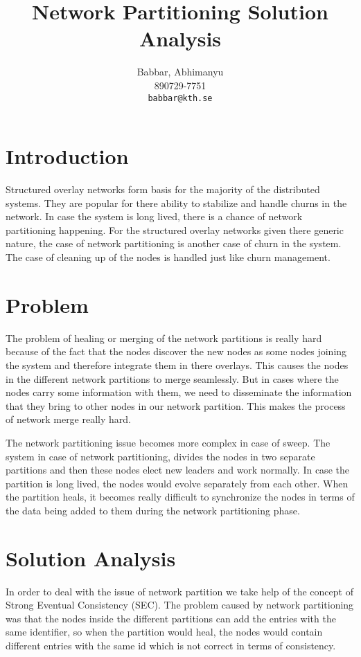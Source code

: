 \documentclass[a4paper, 11pt]{article}
\author{
  Babbar, Abhimanyu\\
  \textsc{890729-7751}\\
  \texttt{babbar@kth.se}
}
\title{Network Partitioning Solution Analysis}
\begin{document}
\maketitle 

\section{Introduction}

Structured overlay networks form basis for the majority of the distributed systems. They are popular for there ability to stabilize and handle churns in the network. In case the system is long lived, there is a chance of network partitioning happening. For the structured overlay networks given there generic nature, the case of network partitioning is another case of churn in the system. The case of cleaning up of the nodes is handled just like churn management. \\



\section{Problem}

The problem of healing or merging of the network partitions is really hard because of the fact that the nodes discover the new nodes as some nodes joining the system and therefore integrate them in there overlays. This causes the nodes in the different network partitions to merge seamlessly. But in cases where the nodes carry some information with them, we need to disseminate the information that they bring to other nodes in our network partition. This makes the process of network merge really hard.

The network partitioning issue becomes more complex in case of sweep. The system in case of network partitioning, divides the nodes in two separate partitions and then these nodes elect new leaders and work normally. In case the partition is long lived, the nodes would evolve separately from each other. 
When the partition heals, it becomes really difficult to synchronize the nodes in terms of the data being added to them during the network partitioning phase.

\section{Solution Analysis}

In order to deal with the issue of network partition we take help of the concept of Strong Eventual Consistency (SEC). The problem caused by network partitioning was that the nodes inside the different partitions can add the entries with the same identifier, so when the partition would heal, the nodes would contain different entries with the same id which is not correct in terms of consistency.\\
\end{document}
